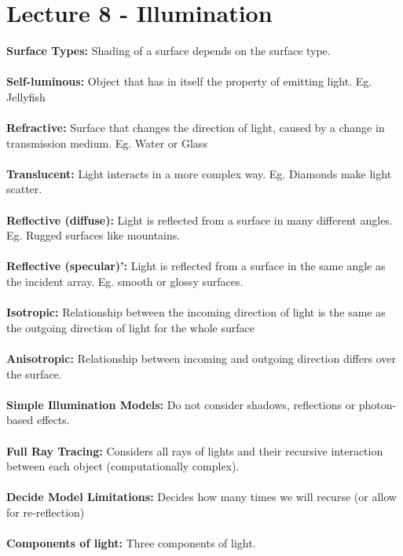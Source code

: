 \documentclass[a4paper,10pt]{article}
\begin{document}
\section*{Lecture 8 - Illumination}
\textcolor{Peach}{\textbf{Surface Types:}} Shading of a surface depends on the surface type. \\\\
\textcolor{Peach}{\textbf{Self-luminous:}} Object that has in itself the property of emitting light. Eg. Jellyfish \\\\
\textcolor{Peach}{\textbf{Refractive:}} Surface that changes the direction of light, caused by a change in transmission medium. Eg. Water or Glass \\\\
\textcolor{Peach}{\textbf{Translucent:}} Light interacts in a more complex way. Eg. Diamonds make light scatter. \\\\
\textcolor{Peach}{\textbf{Reflective (diffuse):}} Light is reflected from a surface in many different angles. Eg. Rugged surfaces like mountains. \\\\
\textcolor{Peach}{\textbf{Reflective (specular)':}} Light is reflected from a surface in the same angle as the incident array. Eg. smooth or glossy surfaces. \\\\
\textcolor{Peach}{\textbf{Isotropic:}} Relationship between the incoming direction of light is the same as the outgoing direction of light for the whole surface \\\\
\textcolor{Peach}{\textbf{Anisotropic:}} Relationship between incoming and outgoing direction differs over the surface. \\\\
\textcolor{Peach}{\textbf{Simple Illumination Models:}} Do not consider shadows, reflections or photon-based effects.  \\\\
\textcolor{Peach}{\textbf{Full Ray Tracing:}} Considers all rays of lights and their recursive interaction between each object (computationally complex). \\\\
\textcolor{Peach}{\textbf{Decide Model Limitations:}} Decides how many times we will recurse (or allow for re-reflection) \\\\
\textcolor{Peach}{\textbf{Components of light:}} Three components of light. \\\\
\end{document}
